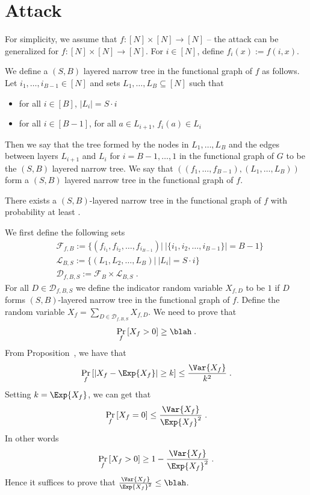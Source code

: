 \section{Attack}
For simplicity, we assume that $f:[N]\times [N]\to [N]$ -- the attack can be generalized for $f:[N]\times [N]\to [N]$. For $i\in [N]$, define $f_i(x):=f(i,x)$.

 We define a $(S,B)$ layered narrow tree in the functional graph of $f$ as follows. 
Let $i_1,\ldots,i_{B-1}\in [N]$ and sets $L_1,\ldots,L_B\subseteq [N]$ such that 
\begin{itemize}
\item for all $i\in [B]$, $|L_i|=S\cdot i$ 
\item for all $i\in [B-1]$, for all $a\in L_{i+1}$, $f_{i}(a)\in L_{i}$
\end{itemize}
Then we say that the tree formed by the nodes in $L_1,\ldots,L_B$ and the edges between layers $L_{i+1}$ and $L_{i}$ for $i=B-1,\ldots,1$ in the functional graph of $G$ to be the $(S,B)$ layered narrow tree. We say that $\left((f_1,\ldots,f_{B-1}),(L_1,\ldots,L_B)\right)$ form a $(S,B)$ layered narrow tree in the functional graph of $f$.
\begin{lemma}
    There exists a $(S,B)$-layered narrow tree in the functional graph of $f$ with probability at least \blah.
\end{lemma}
We first define the following sets
\begin{align*}
&\mathcal{F}_{f,B} :=\{(f_{i_1},f_{i_2},\ldots,f_{i_{B-1}})|~ |\{i_1,i_2,\ldots,i_{B-1}\}|=B-1\}\\
&\mathcal{L}_{B,S}  :=\{(L_1,L_2,\ldots,L_B)|~ |L_i|=S\cdot i\}\\
&\mathcal{D}_{f,B,S}  := \mathcal{F}_B \times \mathcal{L}_{B,S}\;.
\end{align*}
For all $D\in \mathcal{D}_{f,B,S}$ we define the indicator random variable $X_{f,D}$ to be $1$ if $D$ forms $(S,B)$-layered narrow tree in the functional graph of $f$. 
Define the random variable $X_f=\sum_{D\in \mathcal{D}_{f,B,S}}X_{f,D}$.
We need to prove that 
\[
    \Pr_{f}\left[X_f >0 \right]\geq \blah\;.
\]
From Proposition~, we have that 
\[
    \Pr_{f}\left[|X_f-\Exp{X_f}|\geq k\right]\leq \frac{\Var{X_f}}{k^2}\;.
\]
Setting  $k=\Exp{X_f}$, we can get that 
\[
    \Pr_{f}\left[{X_f=0}\right]\leq \frac{\Var{X_f}}{\Exp{X_f}^2}\;.
\]
In other words
\[
    \Pr_{f}\left[{X_f>0}\right]\geq 1-\frac{\Var{X_f}}{\Exp{X_f}^2}\;.
\]
Hence it suffices to prove that $\frac{\Var{X_f}}{\Exp{X_f}^2}\leq \blah$.

